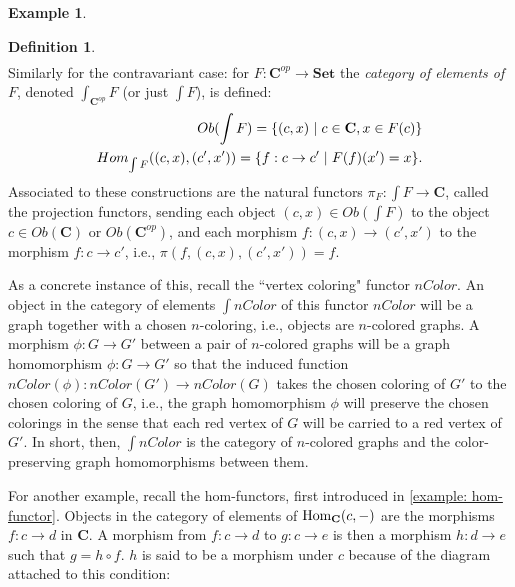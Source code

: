 \documentclass[11pt]{book}
\theoremstyle{definition}
\newtheorem{example}{Example}[section]
\theoremstyle{definition}
\newtheorem{definition}{Definition}[section]
\theoremstyle{definition}
\theoremstyle{theorem}
\theoremstyle{definition}
\begin{document}
\begin{example}
\begin{definition}
\begin{equation}
\begin{split}
		\end{split}
		\end{equation}
		Similarly for the contravariant case: for $F: \textbf{C}^{op} \rightarrow \textbf{Set}$ the \textit{category of elements of} $F$, denoted $\int_{\textbf{C}^{op}} F$ (or just $\int F$), is defined: 
		\begin{equation}
		\begin{split}
		Ob(\int F) = \{(c, x) \hspace*{0.3em}| \hspace*{0.3em} c \in \textbf{C}, x \in F(c) \} \\
		Hom_{\int F}((c,x), (c', x')) = \{f: c \rightarrow c' \hspace*{0.3em} | \hspace*{0.3em} F(f)(x') = x\}.
		\end{split}
		\end{equation}
		Associated to these constructions are the natural functors $\pi_{F}: \int F \rightarrow \textbf{C}$, called the projection functors, sending each object $(c, x) \in Ob(\int F)$ to the object $c \in Ob(\textbf{C})$ or $Ob(\textbf{C}^{op})$, and each morphism $f: (c, x) \rightarrow (c', x')$ to the morphism $f: c \rightarrow c'$, i.e., $\pi(f, (c, x), (c', x')) = f$. 
	\end{definition} \noindent 
	As a concrete instance of this, recall the ``vertex coloring" functor $nColor$.  An object in the category of elements $\int nColor$ of this functor $nColor$ will be a graph together with a chosen $n$-coloring, i.e., objects are $n$-colored graphs. A morphism $\phi: G \rightarrow G'$ between a pair of $n$-colored graphs will be a graph homomorphism $\phi: G \rightarrow G'$ so that the induced function $nColor(\phi): nColor(G') \rightarrow nColor(G)$ takes the chosen coloring of $G'$ to the chosen coloring of $G$, i.e., the graph homomorphism $\phi$ will preserve the chosen colorings in the sense that each red vertex of $G$ will be carried to a red vertex of $G'$. In short, then, $\int nColor$ is the category of $n$-colored graphs and the color-preserving graph homomorphisms between them. \par 
	For another example, recall the hom-functors, first introduced in \ref{example: hom-functor}. Objects in the category of elements of $\text{Hom}_{\textbf{C}}(c, \--)$ are the morphisms $f: c \rightarrow d$ in \textbf{C}. A morphism from $f: c \rightarrow d$ to $g: c \rightarrow e$ is then a morphism $h: d \rightarrow e$ such that $g = h \circ f$. $h$ is said to be a morphism under $c$ because of the diagram attached to this condition: 

\end{example}
\end{document}
